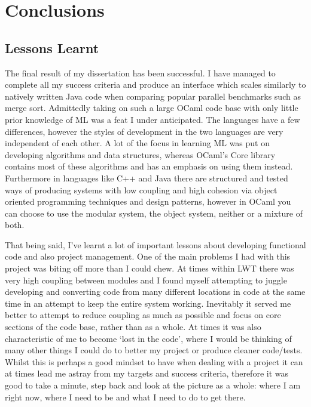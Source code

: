 \documentclass[12pt,twoside,notitlepage]{report}
\begin{document}
\chapter{Conclusions}
\label{chap:conclusions}
%
%

%
%
\section{Lessons Learnt}
The final result of my dissertation has been successful. I have managed to complete all my success criteria and produce an interface which scales similarly to natively written Java code when comparing popular parallel benchmarks such as merge sort. Admittedly taking on such a
large OCaml code base with only little prior knowledge of ML was a feat I under anticipated. The languages have a few differences, however the styles of development in the two languages are very independent of each other. A lot of the
focus in learning ML was put on developing algorithms and data structures, whereas OCaml's Core library contains most of these algorithms and has an emphasis on using them instead. Furthermore in languages like C++ and Java there are
structured and tested ways of producing systems with low coupling and high cohesion via object oriented programming techniques and design patterns, however in OCaml you can choose to use the modular system, the object system, neither
or a mixture of both\cite{chailloux2000}. 

That being said, I've learnt a lot of important lessons about developing functional code and also project management. One of the main problems I had with this project was biting off more than I could chew. At times within LWT there
was very high coupling between modules and I found myself attempting to juggle developing and converting code from many different locations in code at the same time in an attempt to keep the entire system working. Inevitably it served
me better to attempt to reduce coupling as much as possible and focus on core sections of the code base, rather than as a whole. At times it was also characteristic of me to become `lost in the code', where I would be thinking of many
other things I could do to better my project or produce cleaner code/tests. Whilst this is perhaps a good mindset to have when dealing with a project it can at times lead me astray from my targets and success criteria, therefore it
was good to take a minute, step back and look at the picture as a whole: where I am right now, where I need to be and what I need to do to get there.
\end{document}

